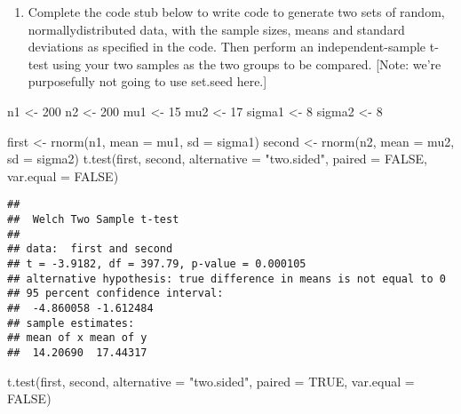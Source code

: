 \documentclass[
]{article}
\newenvironment{Shaded}{\begin{snugshade}}{\end{snugshade}}
\newcommand{\AttributeTok}[1]{\textcolor[rgb]{0.77,0.63,0.00}{#1}}
\newcommand{\ConstantTok}[1]{\textcolor[rgb]{0.00,0.00,0.00}{#1}}
\newcommand{\DecValTok}[1]{\textcolor[rgb]{0.00,0.00,0.81}{#1}}
\newcommand{\FunctionTok}[1]{\textcolor[rgb]{0.00,0.00,0.00}{#1}}
\newcommand{\NormalTok}[1]{#1}
\newcommand{\OtherTok}[1]{\textcolor[rgb]{0.56,0.35,0.01}{#1}}
\newcommand{\StringTok}[1]{\textcolor[rgb]{0.31,0.60,0.02}{#1}}
\providecommand{\tightlist}{%
  \setlength{\itemsep}{0pt}\setlength{\parskip}{0pt}}
\begin{document}
\begin{enumerate}
\def\labelenumi{\alph{enumi}.}
\tightlist
\item
  Complete the code stub below to write code to generate two sets of
  random, normallydistributed data, with the sample sizes, means and
  standard deviations as specified in the code. Then perform an
  independent-sample t-test using your two samples as the two groups to
  be compared. {[}Note: we're purposefully not going to use set.seed
  here.{]}
\end{enumerate}

\begin{Shaded}
\begin{Highlighting}[]
\NormalTok{n1 }\OtherTok{\textless{}{-}} \DecValTok{200}
\NormalTok{n2 }\OtherTok{\textless{}{-}} \DecValTok{200}
\NormalTok{mu1 }\OtherTok{\textless{}{-}} \DecValTok{15}
\NormalTok{mu2 }\OtherTok{\textless{}{-}} \DecValTok{17}
\NormalTok{sigma1 }\OtherTok{\textless{}{-}} \DecValTok{8}
\NormalTok{sigma2 }\OtherTok{\textless{}{-}} \DecValTok{8}

\NormalTok{first }\OtherTok{\textless{}{-}} \FunctionTok{rnorm}\NormalTok{(n1, }\AttributeTok{mean =}\NormalTok{ mu1, }\AttributeTok{sd =}\NormalTok{ sigma1)}
\NormalTok{second }\OtherTok{\textless{}{-}} \FunctionTok{rnorm}\NormalTok{(n2, }\AttributeTok{mean =}\NormalTok{ mu2, }\AttributeTok{sd =}\NormalTok{ sigma2)}
\FunctionTok{t.test}\NormalTok{(first, second, }\AttributeTok{alternative =} \StringTok{"two.sided"}\NormalTok{, }\AttributeTok{paired =} \ConstantTok{FALSE}\NormalTok{, }\AttributeTok{var.equal =} \ConstantTok{FALSE}\NormalTok{)}
\end{Highlighting}
\end{Shaded}

\begin{verbatim}
## 
##  Welch Two Sample t-test
## 
## data:  first and second
## t = -3.9182, df = 397.79, p-value = 0.000105
## alternative hypothesis: true difference in means is not equal to 0
## 95 percent confidence interval:
##  -4.860058 -1.612484
## sample estimates:
## mean of x mean of y 
##  14.20690  17.44317
\end{verbatim}

\begin{Shaded}
\begin{Highlighting}[]
\FunctionTok{t.test}\NormalTok{(first, second, }\AttributeTok{alternative =} \StringTok{"two.sided"}\NormalTok{, }\AttributeTok{paired =} \ConstantTok{TRUE}\NormalTok{, }\AttributeTok{var.equal =} \ConstantTok{FALSE}\NormalTok{)}
\end{Highlighting}
\end{Shaded}
\end{document}
